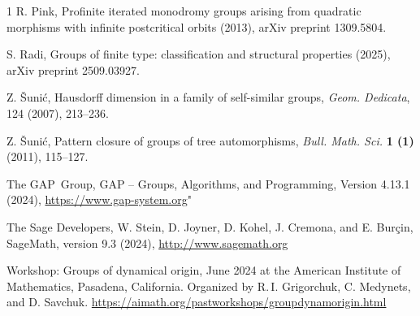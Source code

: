 \documentclass{amsart}
\begin{document}
\begin{thebibliography}{1}
R. Pink, Profinite iterated monodromy groups arising from quadratic morphisms with infinite postcritical orbits (2013), arXiv preprint 1309.5804.

S. Radi, Groups of finite type: classification and structural properties (2025), arXiv preprint 2509.03927.

Z. \v Suni\'c, Hausdorff dimension in a family of self-similar groups, \textit{Geom. Dedicata}, 124 (2007), 213--236.

Z. \v Suni\'c, Pattern closure of groups of tree automorphisms, \textit{Bull. Math. Sci.} \textbf{1 (1)} (2011), 115--127.

The GAP~Group, GAP -- Groups, Algorithms, and Programming, Version 4.13.1 (2024), \url{https://www.gap-system.org}"

The Sage Developers, W. Stein, D. Joyner, D. Kohel, J. Cremona, and E. Burçin, SageMath, version 9.3 (2024), \url{http://www.sagemath.org}

Workshop: Groups of dynamical origin, June 2024
at the American Institute of Mathematics, Pasadena, California. Organized by R.\,I. Grigorchuk, C. Medynets, and D. Savchuk. \url{https://aimath.org/pastworkshops/groupdynamorigin.html}

\end{thebibliography}
\end{document}
